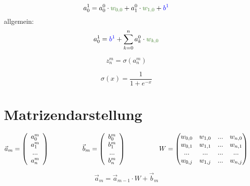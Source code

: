 \documentclass{article}
\begin{document}
\[ a_0^1 = a_0^0 \cdot \textcolor{OliveGreen}{w_{0,0}} + a_1^0 \cdot \textcolor{OliveGreen}{w_{1,0}} + \textcolor{blue}{b^1} \]
allgemein:
\[  a_0^1 = \textcolor{blue}{b^1} + \sum_{k=0}^{n} a_k^0 \cdot \textcolor{OliveGreen}{w_{k,0}}  \]

\[z_n^m = \sigma(a_n^m)\]

\[\sigma(x) = \frac{1}{1 + e^{-x}}\]


\section{Matrizendarstellung}

\[ \vec{a}_m = \left(\begin{array}{c} a_0^m \\ a_1^m \\ ... \\ a_n^m \end{array}\right) 
\kern 50pt
\vec{b}_m = \left(\begin{array}{c} b_0^m \\ b_1^m \\ ... \\ b_n^m \end{array}\right) 
\kern 50pt
W = \begin{pmatrix}
    w_{0,0} & w_{1,0} & ... & w_{n,0} \\
    w_{0,1} & w_{1,1} & ... & w_{n,1} \\
    ... & ... & ... & ... \\
    w_{0,j} & w_{1,j} & ... & w_{n,j}
\end{pmatrix} \]

\[ \vec{a}_m = \vec{a}_{m-1} \cdot W + \vec{b}_m \]
\end{document}
